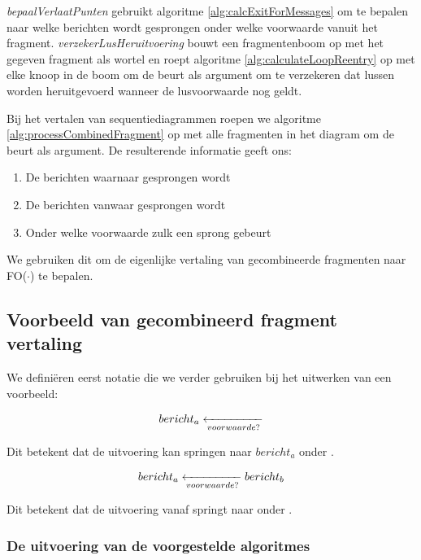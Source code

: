 \textit{bepaalVerlaatPunten} gebruikt algoritme \ref{alg:calcExitForMessages} om te bepalen naar welke berichten wordt gesprongen onder welke voorwaarde vanuit het fragment. \textit{verzekerLusHeruitvoering} bouwt een fragmentenboom op met het gegeven fragment als wortel en roept algoritme \ref{alg:calculateLoopReentry} op met elke knoop in de boom om de beurt als argument om te verzekeren dat lussen worden heruitgevoerd wanneer de lusvoorwaarde nog geldt.

Bij het vertalen van sequentiediagrammen roepen we algoritme \ref{alg:processCombinedFragment} op met alle fragmenten in het diagram om de beurt als argument. De resulterende informatie geeft ons:

\begin{enumerate}
	\item De berichten waarnaar gesprongen wordt
	\item De berichten vanwaar gesprongen wordt
	\item Onder welke voorwaarde zulk een sprong gebeurt
\end{enumerate}

We gebruiken dit om de eigenlijke vertaling van gecombineerde fragmenten naar FO($\cdot$) te bepalen.

\subsection{Voorbeeld van gecombineerd fragment vertaling}

We defini\"eren eerst notatie die we verder gebruiken bij het uitwerken van een voorbeeld:

\begin{align*}
	\transitionentry{\fragcond{voorwaarde}}{\fragmessage{$bericht_a$}}
\end{align*}

Dit betekent dat de uitvoering kan springen naar $bericht_a$ onder \textit{}.

\begin{align*}
	\transitionentry[\fragmessage{$bericht_b$}]{\fragcond{voorwaarde}}{\fragmessage{$bericht_a$}}
\end{align*}

Dit betekent dat de uitvoering vanaf  springt naar  onder \textit{}.

\subsubsection{De uitvoering van de voorgestelde algoritmes}

